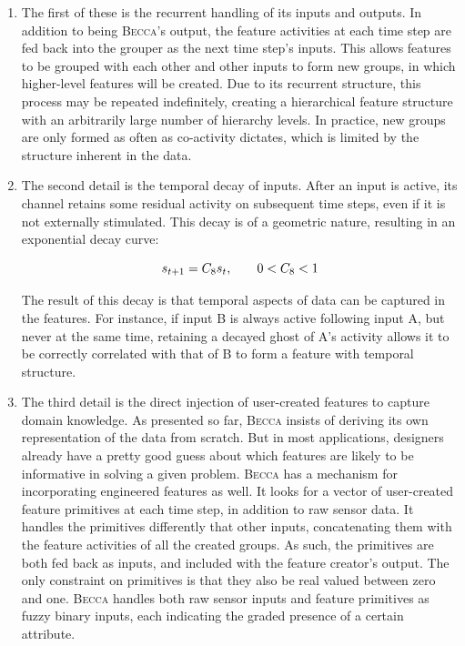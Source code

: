 \begin{enumerate}

\item The first of these is the recurrent handling of its inputs and outputs. In addition to being \textsc{Becca}'s output, the feature activities at each time step are fed back into the grouper as the next time step's inputs. This allows features to be grouped with each other and other inputs to form new groups, in which higher-level features will be created. Due to its recurrent structure, this process may be repeated indefinitely, creating a hierarchical feature structure with an arbitrarily large number of hierarchy levels. In practice, new groups are only formed as often as co-activity dictates, which is limited by the structure inherent in the data.

\item The second detail is the temporal decay of inputs. After an input is active, its channel retains some residual activity on subsequent time steps, even if it is not externally stimulated. This decay is of a geometric nature, resulting in an exponential decay curve: 

\begin{equation}
s_{t+1} = C_8 s_t \mbox{,   \hspace{0.2in}  } 0 < C_8 < 1
\end{equation}

The result of this decay is that temporal aspects of data can be captured in the features. For instance, if input B is always active following input A, but never at the same time, retaining a decayed ghost of A's activity allows it to be correctly correlated with that of B to form a feature with temporal structure.

\item The third detail is the direct injection of user-created features to capture domain knowledge. As presented so far, \textsc{Becca} insists of deriving its own representation of the data from scratch. But in most applications, designers already have a pretty good guess about which features are likely to be informative in solving a given problem. \textsc{Becca} has a mechanism for incorporating engineered features as well. It looks for a vector of user-created feature primitives at each time step, in addition to raw sensor data. It handles the primitives differently that other inputs, concatenating them with the feature activities of all the created groups. As such, the primitives are both fed back as inputs, and included with the feature creator's output. The only constraint on primitives is that they also be real valued between zero and one. \textsc{Becca} handles both raw sensor inputs and feature primitives as fuzzy binary inputs, each indicating the graded presence of a certain attribute.

\end{enumerate}


